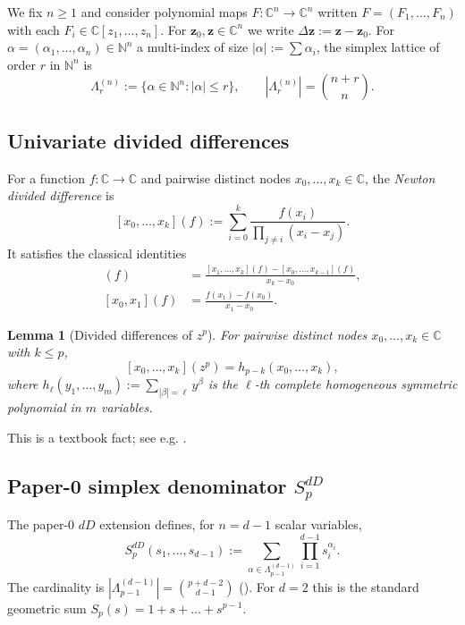 \documentclass[11pt,a4paper]{article}
\newtheorem{lemma}[theorem]{Lemma}
\theoremstyle{definition}
\theoremstyle{remark}
\newcommand{\C}{\mathbb{C}}
\newcommand{\N}{\mathbb{N}}
\newcommand{\zb}{\mathbf{z}}
\begin{document}
We fix $n \ge 1$ and consider polynomial maps $F : \C^n \to \C^n$ written
$F = (F_1, \dots, F_n)$ with each $F_i \in \C[z_1, \dots, z_n]$.
For $\zb_0, \zb \in \C^n$ we write $\Delta\zb := \zb - \zb_0$.
For $\alpha = (\alpha_1, \dots, \alpha_n) \in \N^n$ a multi-index of size
$|\alpha| := \sum \alpha_i$, the simplex lattice of order $r$ in $\N^n$ is
\[
\Lambda_r^{(n)} := \{\alpha \in \N^n : |\alpha| \le r\},
\qquad |\Lambda_r^{(n)}| = \binom{n+r}{n}.
\]

\subsection{Univariate divided differences}

For a function $f : \C \to \C$ and pairwise distinct nodes
$x_0, \dots, x_k \in \C$, the \emph{Newton divided difference} is
\[
[x_0, \dots, x_k](f) := \sum_{i=0}^{k} \frac{f(x_i)}{\prod_{j \ne i} (x_i - x_j)}.
\]
It satisfies the classical identities
\begin{align}
[x_0, \dots, x_k](f) &= \frac{[x_1, \dots, x_k](f) - [x_0, \dots, x_{k-1}](f)}{x_k - x_0}, \\
[x_0, x_1](f) &= \frac{f(x_1) - f(x_0)}{x_1 - x_0}.
\end{align}

\begin{lemma}[Divided differences of $z^p$]\label{lem:dd-monomial}
For pairwise distinct nodes $x_0, \dots, x_k \in \C$ with $k \le p$,
\[
[x_0, \dots, x_k](z^p) = h_{p-k}(x_0, \dots, x_k),
\]
where $h_\ell(y_1, \dots, y_m) := \sum_{|\beta|=\ell} y^\beta$ is the
$\ell$-th complete homogeneous symmetric polynomial in $m$ variables.
\end{lemma}

This is a textbook fact; see e.g. \cite[Eq.~(7.20)]{stoer}.

\subsection{Paper-0 simplex denominator $S_p^{dD}$}

The paper-0 $dD$ extension defines, for $n = d - 1$ scalar variables,
\begin{equation}\label{eq:Sp-dD}
S_p^{dD}(s_1, \dots, s_{d-1}) := \sum_{\alpha \in \Lambda_{p-1}^{(d-1)}}
\prod_{i=1}^{d-1} s_i^{\alpha_i}.
\end{equation}
The cardinality is $|\Lambda_{p-1}^{(d-1)}| = \binom{p + d - 2}{d - 1}$
(\cite[Lemma 2.1]{pandrosion-dD}). For $d = 2$ this is the standard
geometric sum $S_p(s) = 1 + s + \dots + s^{p-1}$.
\end{document}
